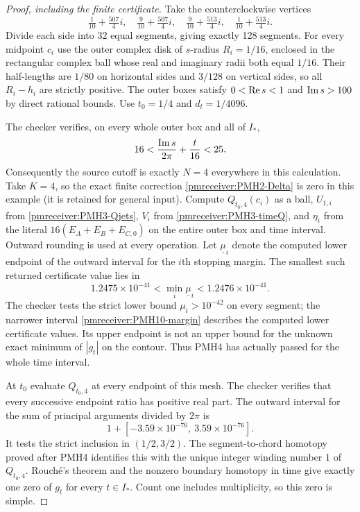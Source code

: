 \begin{proof}[Proof, including the finite certificate]
Take the counterclockwise vertices
\[
 \tfrac1{10}+\tfrac{507}{4}i,\quad
 \tfrac9{10}+\tfrac{507}{4}i,\quad
 \tfrac9{10}+\tfrac{513}{4}i,\quad
 \tfrac1{10}+\tfrac{513}{4}i.
\]
Divide each side into 32 equal segments, giving exactly 128
segments. For every midpoint $c_i$ use the outer complex disk of
$s$-radius $R_i=1/16$, enclosed in the rectangular complex ball
whose real and imaginary radii both equal $1/16$. Their half-lengths
are $1/80$ on horizontal sides and $3/128$ on vertical sides, so
all $R_i-h_i$ are strictly positive. The outer boxes satisfy
$0<\operatorname{Re} s<1$ and $\operatorname{Im} s>100$ by direct rational bounds.
Use $t_0=1/4$ and $d_t=1/4096$.

The checker verifies, on every whole outer box and all of $I_*$,
\[
 16<\frac{\operatorname{Im} s}{2\pi}+\frac t{16}<25.
\]
Consequently the source cutoff is exactly $N=4$ everywhere in this
calculation. Take $K=4$, so the exact finite correction
\eqref{pmreceiver:PMH2-Delta} is zero in this example (it is retained for
general input). Compute $Q_{t_0,4}(c_i)$ as a ball, $U_{1,i}$ from
\eqref{pmreceiver:PMH3-Qjets}, $V_i$ from \eqref{pmreceiver:PMH3-timeQ}, and $\eta_i$
from the literal $16(E_A+E_B+E_{C,0})$ on the entire outer box and
time interval. Outward rounding is used at every operation.
Let $\underline\mu_i$ denote the computed lower endpoint of the
outward interval for the $i$th stopping margin. The smallest such
returned certificate value lies in
\begin{equation}\label{pmreceiver:PMH10-margin}
 1.2475\times10^{-41}<\min_i\underline\mu_i<1.2476\times10^{-41}.
\end{equation}
The checker tests the strict lower bound $\mu_i>10^{-42}$ on every
segment; the narrower interval \eqref{pmreceiver:PMH10-margin} describes the
computed lower certificate values. Its upper endpoint is not an
upper bound for the unknown exact minimum of $|g_t|$ on the contour.
Thus PMH4 has actually passed for the whole time interval.

At $t_0$ evaluate $Q_{t_0,4}$ at every endpoint of this mesh.
The checker verifies that every successive endpoint ratio has
positive real part. The outward interval for the sum of principal
arguments divided by $2\pi$ is
\[
 1+[-3.59\times10^{-76},\ 3.59\times10^{-76}].
\]
It tests the strict inclusion in $(1/2,3/2)$. The segment-to-chord
homotopy proved after PMH4 identifies this with the unique integer
winding number $1$ of $Q_{t_0,4}$. Rouch\'e's theorem and the
nonzero boundary homotopy in time give exactly one zero of $g_t$
for every $t\in I_*$. Count one includes multiplicity, so this zero
is simple.


\end{proof}

